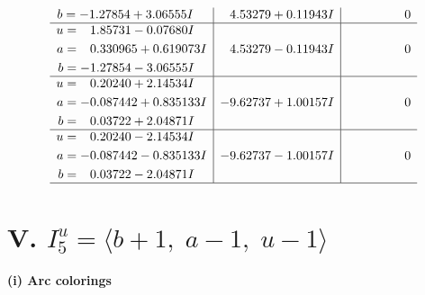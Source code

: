 \documentclass[1p]{elsarticle_modified}
\theoremstyle{definition}
\begin{document}
$$\begin{array}{c|c|c}
\begin{aligned}
b &= -1.27854 + 3.06555 I\end{aligned}
 & \phantom{-}4.53279 + 0.11943 I & \phantom{-0.000000 } 0 \\ \hline\begin{aligned}
u &= \phantom{-}1.85731 - 0.07680 I \\
a &= \phantom{-}0.330965 + 0.619073 I \\
b &= -1.27854 - 3.06555 I\end{aligned}
 & \phantom{-}4.53279 - 0.11943 I & \phantom{-0.000000 } 0 \\ \hline\begin{aligned}
u &= \phantom{-}0.20240 + 2.14534 I \\
a &= -0.087442 + 0.835133 I \\
b &= \phantom{-}0.03722 + 2.04871 I\end{aligned}
 & -9.62737 + 1.00157 I & \phantom{-0.000000 } 0 \\ \hline\begin{aligned}
u &= \phantom{-}0.20240 - 2.14534 I \\
a &= -0.087442 - 0.835133 I \\
b &= \phantom{-}0.03722 - 2.04871 I\end{aligned}
 & -9.62737 - 1.00157 I & \phantom{-0.000000 } 0\\
 \hline 
 \end{array}$$\newpage\newpage\renewcommand{\arraystretch}{1}
\centering \section*{V. $I^u_{5}= \langle b+1,\;a-1,\;u-1 \rangle$}
\flushleft \textbf{(i) Arc colorings}\\
\end{document}
